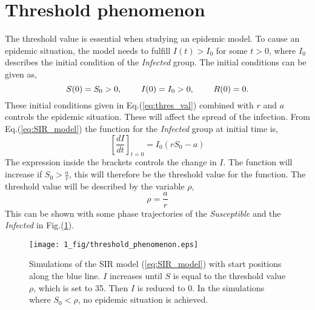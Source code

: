 \documentclass[%
twoside,                 %
final,                   %
chapterprefix=true,      %
open=right               %
10pt]{book}
\begin{document}
\section{Threshold phenomenon}
The threshold value is essential when studying an epidemic model. To cause an epidemic situation, the model needs to fulfill $I(t)> I_0$ for some $t>0$, where $I_0$ describes the initial condition of  the \emph{Infected} group. The initial conditions can be given as,
\begin{equation} \label{eq:thres_val}
S(0)=S_0 > 0,\hspace{8mm} I(0)=I_0>0,\hspace{8mm} R(0) =0.
\end{equation}
These initial conditions given in Eq.(\ref{eq:thres_val}) combined with $r$ and $a$ controls the epidemic situation. These will affect the spread of the infection. From Eq.(\ref{eq:SIR_model}) the function for the \emph{Infected} group at initial time is,
\begin{equation}
\left[\frac{dI}{dt}\right]_{t=0} = I_0(rS_0-a)
\end{equation}
The expression inside the brackets controls the change in $I$. The function will increase if $S_0 > \frac{a}{r}$, this will therefore be the threshold value for the function. The threshold value will be described by the variable $\rho$,
\begin{equation} \label{eq:threshold_value}
\rho = \frac{a}{r}
\end{equation}
This can be shown with some phase trajectories of the \emph{Susceptible} and the \emph{Infected} in Fig.(\ref{fig:threshold_phenomenon}).  


\begin{figure}[ht]
  \centerline{\texttt{[image: 1\_fig/threshold\_phenomenon.eps]}}
  \caption{
  \label{fig:threshold_phenomenon} Simulations of the SIR model (\ref{eq:SIR_model}) with start positions along the blue line. $I$ increases until $S$ is equal to the threshold value $\rho$, which is set to 35. Then $I$ is reduced to 0. In the simulations where $S_0 < \rho$, no epidemic situation is achieved.
  }
\end{figure}
\end{document}
